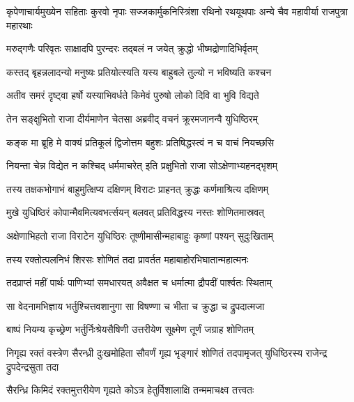 \threelineshloka
{कृपेणाचार्यमुख्येन सहिताः कुरवो नृपाः}
{सज्जकार्मुकनिस्त्रिंशा रथिनो रथयूथपाः}
{अन्ये चैव महावीर्या राजपुत्रा महारथाः}


\twolineshloka
{मरुद्गणैः परिवृतः साक्षादपि पुरन्दरः}
{तद्बलं न जयेत् क्रुद्धो भीष्मद्रोणादिभिर्वृतम्}


\twolineshloka
{कस्तद् बृहन्नलादन्यो मनुष्यः प्रतियोत्स्यति}
{यस्य बाहुबले तुल्यो न भविष्यति कश्चन}


\twolineshloka
{अतीव समरं दृष्ट्वा हर्षो यस्याभिवर्धते}
{किमेवं पुरुषो लोको दिवि वा भुवि विद्यते}



\twolineshloka
{तेन सङ्क्षुभितो राजा दीर्यमाणेन चेतसा}
{अब्रवीद् वचनं क्रूरमजानन्वै युधिष्ठिरम्}


\twolineshloka
{कङ्क मा ब्रूहि मे वाक्यं प्रतिकूलं द्विजोत्तम}
{बहुशः प्रतिषिद्धस्त्वं न च वाचं नियच्छसि}


\twolineshloka
{नियन्ता चेन्न विद्येत न कश्चिद् धर्ममाचरेत्}
{इति प्रक्षुभितो राजा सोऽक्षेणाभ्यहनद्भृशम्}


\twolineshloka
{तस्य तक्षकभोगाभं बाहुमुत्क्षिप्य दक्षिणम्}
{विराटः प्राहनत् क्रुद्धः कर्णमाश्रित्य दक्षिणम्}


\twolineshloka
{मुखे युधिष्ठिरं कोपान्मैवमित्यवभर्त्सयन्}
{बलवत् प्रतिविद्धस्य नस्तः शोणितमास्रवत्}


\twolineshloka
{अक्षेणाभिहतो राजा विराटेन युधिष्ठिरः}
{तूष्णीमासीन्महाबाहुः कृष्णां पश्यन् सुदुःखिताम्}


\twolineshloka
{तस्य रक्तोत्पलनिभं शिरसः शोणितं तदा}
{प्रावर्तत महाबाहोरभिघातान्महात्मनः}


\twolineshloka
{तदप्राप्तं महीं पार्थः पाणिभ्यां समधारयत्}
{अवैक्षत च धर्मात्मा द्रौपदीं पार्श्वतः स्थिताम्}


\twolineshloka
{सा वेदनामभिज्ञाय भर्तुश्चित्तवशानुगा}
{सा विषण्णा च भीता च क्रुद्धा च द्रुपदात्मजा}


\twolineshloka
{बाष्पं नियम्य कृच्छ्रेण भर्तुर्निःश्रेयसैषिणी}
{उत्तरीयेण सूक्ष्मेण तूर्णं जग्राह शोणितम्}


\threelineshloka
{निगृह्य रक्तं वस्त्रेण सैरन्ध्री दुःखमोहिता}
{सौवर्णं गृह्य भृङ्गारं शोणितं तदपामृजत्}
{युधिष्ठिरस्य राजेन्द्र द्रुपदेन्द्रसुता तदा}




\twolineshloka
{सैरन्ध्रि किमिदं रक्तमुत्तरीयेण गृह्यते}
{कोऽत्र हेतुर्विशालाक्षि तन्ममाचक्ष्व तत्त्वतः}




